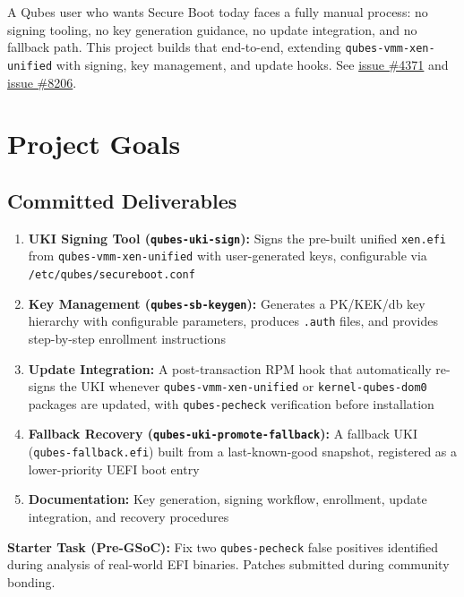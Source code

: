 \documentclass[12pt, a4paper]{article}
\begin{document}
A Qubes user who wants Secure Boot today faces a fully manual process: no signing tooling, no key generation guidance, no update integration, and no fallback path. This project builds that end-to-end, extending \texttt{qubes-vmm-xen-unified} with signing, key management, and update hooks. See \href{https://github.com/QubesOS/qubes-issues/issues/4371}{issue \#4371} and \href{https://github.com/QubesOS/qubes-issues/issues/8206}{issue \#8206}.

\section{Project Goals}

\subsection*{Committed Deliverables}
\begin{enumerate}
    \item \textbf{UKI Signing Tool (\texttt{qubes-uki-sign}):} Signs the pre-built unified \texttt{xen.efi} from \texttt{qubes-vmm-xen-unified} with user-generated keys, configurable via \texttt{/etc/qubes/secureboot.conf}
    \item \textbf{Key Management (\texttt{qubes-sb-keygen}):} Generates a PK/KEK/db key hierarchy with configurable parameters, produces \texttt{.auth} files, and provides step-by-step enrollment instructions
    \item \textbf{Update Integration:} A post-transaction RPM hook that automatically re-signs the UKI whenever \texttt{qubes-vmm-xen-unified} or \texttt{kernel-qubes-dom0} packages are updated, with \texttt{qubes-pecheck} verification before installation
    \item \textbf{Fallback Recovery (\texttt{qubes-uki-promote-fallback}):} A fallback UKI (\texttt{qubes-fallback.efi}) built from a last-known-good snapshot, registered as a lower-priority UEFI boot entry
    \item \textbf{Documentation:} Key generation, signing workflow, enrollment, update integration, and recovery procedures
\end{enumerate}

\textbf{Starter Task (Pre-GSoC):} Fix two \texttt{qubes-pecheck} false positives identified during analysis of real-world EFI binaries. Patches submitted during community bonding.
\end{document}
